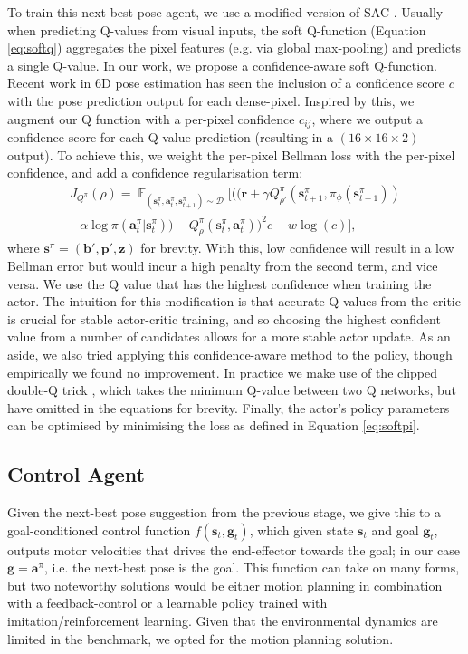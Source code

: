 \documentclass[letterpaper, 10 pt, journal, twoside]{IEEEtran}
\newcommand{\bs}{\mathbf{s}}
\newcommand{\ba}{\mathbf{a}}
\newcommand{\br}{\mathbf{r}}
\newcommand{\bg}{\mathbf{g}}
\newcommand{\st}{\bs_t}
\newcommand{\at}{\ba_t}
\newcommand{\gt}{\bg_t}
\newcommand{\aNbp}{\ba^\pi}
\newcommand{\aNbpt}{\at^\pi}
\newcommand{\stp}{\bs_{t+1}}
\newcommand{\qcritic}{Q^{\pi}}
\newcommand{\qcriticp}{\rho}
\newcommand{\pip}{\phi}
\newcommand{\ctr}{f}
\newcommand{\rgb}{\mathbf{b}}
\newcommand{\pcd}{\mathbf{p}}
\newcommand{\proprio}{\mathbf{z}}
\newcommand{\replay}{\mathcal{D}}
\DeclareMathOperator*{\E}{\mathbb{E}}
\begin{document}
To train this next-best pose agent, we use a modified version of SAC \cite{haarnoja2018soft}. Usually when predicting Q-values from visual inputs, the soft Q-function (Equation \ref{eq:softq}) aggregates the pixel features (e.g. via global max-pooling) and predicts a single Q-value. In our work, we propose a confidence-aware soft Q-function. Recent work in 6D pose estimation \cite{wang2019densefusion, wada2020morefusion} has seen the inclusion of a confidence score $c$ with the pose prediction output for each dense-pixel. Inspired by this, we augment our Q function with a per-pixel confidence $c_{ij}$, where we output a confidence score for each Q-value prediction (resulting in a $(16 \times 16 \times 2)$ output). To achieve this, we weight the per-pixel Bellman loss with the per-pixel confidence, and add a confidence regularisation term:
\begin{multline}
J_{\qcritic}(\qcriticp) = \E_{(\st^\pi, \aNbpt, \stp^\pi) \sim \replay} [ ((\br + \gamma \qcritic_{\qcriticp'}(\stp^\pi, \pi_{\pip}(\stp^\pi)) \\ - \alpha \log \pi (\aNbpt|\st^\pi)) - \qcritic_{\qcriticp}(\st^\pi, \aNbpt))^2 c - w \log(c)],
\end{multline}
where $\bs^\pi = (\rgb', \pcd', \proprio)$ for brevity. With this, low confidence will result in a low Bellman error but would incur a high penalty from the second term, and vice versa. We use the Q value that has the highest confidence when training the actor. The intuition for this modification is that accurate Q-values from the critic is crucial for stable actor-critic training, and so choosing the highest confident value from a number of candidates allows for a more stable actor update. As an aside, we also tried applying this confidence-aware method to the policy, though empirically we found no improvement. In practice we make use of the clipped double-Q trick \cite{fujimoto2018addressing}, which takes the minimum Q-value between two Q networks, but have omitted in the equations for brevity. Finally, the actor's policy parameters can be optimised by minimising the loss as defined in Equation \ref{eq:softpi}.

\subsection{Control Agent}
\label{sec:phase3}

Given the next-best pose suggestion from the previous stage, we give this to a goal-conditioned control function $\ctr(\st, \gt)$, which given state $\st$ and goal $\gt$, outputs motor velocities that drives the end-effector towards the goal; in our case $\bg = \aNbp$, i.e. the next-best pose is the goal. This function can take on many forms, but two noteworthy solutions would be either motion planning in combination with a feedback-control or a learnable policy trained with imitation/reinforcement learning. Given that the environmental dynamics are limited in the benchmark, we opted for the motion planning solution.
\end{document}
